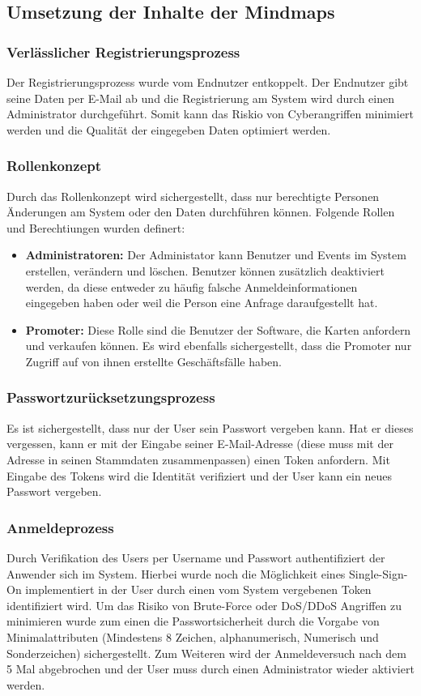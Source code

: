 \subsection{Umsetzung der Inhalte der Mindmaps}
\subsubsection{Verlässlicher Registrierungsprozess}
Der Registrierungsprozess wurde vom Endnutzer entkoppelt. Der Endnutzer gibt seine Daten per E-Mail ab und die Registrierung am System wird durch einen Administrator durchgeführt. Somit kann das Riskio von Cyberangriffen minimiert werden und die Qualität der eingegeben Daten optimiert werden.
\subsubsection{Rollenkonzept}
Durch das Rollenkonzept wird sichergestellt, dass nur berechtigte Personen Änderungen am System oder den Daten durchführen können. Folgende Rollen und Berechtiungen wurden definert: 
\begin{itemize}
	\item \textbf{Administratoren:} Der Administator kann Benutzer und Events im System erstellen, verändern und löschen. Benutzer können zusätzlich deaktiviert werden, da diese entweder zu häufig falsche Anmeldeinformationen eingegeben haben oder weil die Person eine Anfrage daraufgestellt hat.
	\item \textbf{Promoter:} Diese Rolle sind die Benutzer der Software, die Karten anfordern und verkaufen können. Es wird ebenfalls sichergestellt, dass die Promoter nur Zugriff auf von ihnen erstellte Geschäftsfälle haben.
\end{itemize}

\subsubsection{Passwortzurücksetzungsprozess}
Es ist sichergestellt, dass nur der User sein Passwort vergeben kann. Hat er dieses vergessen, kann er mit der Eingabe seiner E-Mail-Adresse (diese muss mit der Adresse in seinen Stammdaten zusammenpassen) einen Token anfordern. Mit Eingabe des Tokens wird die Identität verifiziert und der User kann ein neues Passwort vergeben.
\subsubsection{Anmeldeprozess}
Durch Verifikation des Users per Username und Passwort authentifiziert der Anwender sich im System. Hierbei wurde noch die Möglichkeit eines Single-Sign-On implementiert in der User durch einen vom System vergebenen Token identifiziert wird. Um das Risiko von Brute-Force oder DoS/DDoS Angriffen zu minimieren wurde zum einen die Passwortsicherheit durch die Vorgabe von Minimalattributen (Mindestens 8 Zeichen, alphanumerisch, Numerisch und Sonderzeichen) sichergestellt. Zum Weiteren wird der Anmeldeversuch nach dem 5 Mal abgebrochen und der User muss durch einen Administrator wieder aktiviert werden.
